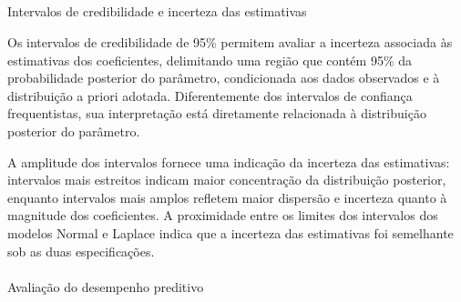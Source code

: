 \documentclass[
  brazilian,
  12pt,
  letterpaper,
  DIV=11,
  numbers=noendperiod]{scrartcl}
\makeatletter
\let\oldparagraph\paragraph
\renewcommand{\paragraph}{
    \@ifstar
      \xxxParagraphStar
      \xxxParagraphNoStar
  }
\newcommand{\xxxParagraphStar}[1]{\oldparagraph*{#1}\mbox{}}
\newcommand{\xxxParagraphNoStar}[1]{\oldparagraph{#1}\mbox{}}
\let\oldsubparagraph\subparagraph
\renewcommand{\subparagraph}{
    \@ifstar
      \xxxSubParagraphStar
      \xxxSubParagraphNoStar
  }
\newcommand{\xxxSubParagraphStar}[1]{\oldsubparagraph*{#1}\mbox{}}
\newcommand{\xxxSubParagraphNoStar}[1]{\oldsubparagraph{#1}\mbox{}}
\makeatother
\begin{document}
\subparagraph{Intervalos de credibilidade e incerteza das
estimativas}\label{intervalos-de-credibilidade-e-incerteza-das-estimativas}

Os intervalos de credibilidade de 95\% permitem avaliar a incerteza
associada às estimativas dos coeficientes, delimitando uma região que
contém 95\% da probabilidade posterior do parâmetro, condicionada aos
dados observados e à distribuição a priori adotada. Diferentemente dos
intervalos de confiança frequentistas, sua interpretação está
diretamente relacionada à distribuição posterior do parâmetro.

A amplitude dos intervalos fornece uma indicação da incerteza das
estimativas: intervalos mais estreitos indicam maior concentração da
distribuição posterior, enquanto intervalos mais amplos refletem maior
dispersão e incerteza quanto à magnitude dos coeficientes. A proximidade
entre os limites dos intervalos dos modelos Normal e Laplace indica que
a incerteza das estimativas foi semelhante sob as duas especificações.

\paragraph{Avaliação do desempenho
preditivo}\label{avaliauxe7uxe3o-do-desempenho-preditivo}

\begin{table}

\caption{\label{tbl-results-all}Métricas de desempenho dos modelos de
regressão logística bayesiano e frequentista para previsão de PD30 no
conjunto de teste.}


\end{table}%
\end{document}
